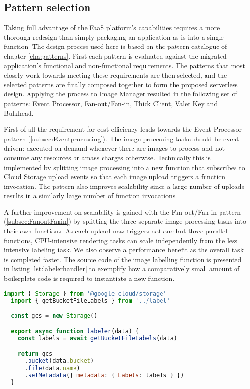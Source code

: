 \subsection{Pattern selection}

Taking full advantage of the FaaS platform's capabilities requires a more thorough redesign than simply packaging an application as-is into a single function. The design process used here is based on the pattern catalogue of chapter \ref{cha:patterns}. First each pattern is evaluated against the migrated application's functional and non-functional requirements. The patterns that most closely work towards meeting these requirements are then selected, and the selected patterns are finally composed together to form the proposed serverless design. Applying the process to Image Manager resulted in the following set of patterns: Event Processor, Fan-out/Fan-in, Thick Client, Valet Key and Bulkhead.

First of all the requirement for cost-efficiency leads towards the Event Processor pattern (\ref{subsec:Eventprocessing}). The image processing tasks should be event-driven: executed on-demand whenever there are images to process and not consume any resources or amass charges otherwise. Technically this is implemented by splitting image processing into a new function that subscribes to Cloud Storage upload events so that each image upload triggers a function invocation. The pattern also improves scalability since a large number of uploads results in a similarly large number of function invocations.

A further improvement on scalability is gained with the Fan-out/Fan-in pattern (\ref{subsec:FanoutFanin}) by splitting the three separate image processing tasks into their own functions. As each upload now triggers not one but three parallel functions, CPU-intensive rendering tasks can scale independently from the less intensive labeling task. We also observe a performance benefit as the overall task is completed faster. The source code of the image labelling function is presented in listing \ref{lst:labelerhandler} to exemplify how a comparatively small amount of boilerplate code is required to instantiate a new function.

\begin{lstlisting}[language=JavaScript,caption=Image labeler function handler,captionpos=b,label=lst:labelerhandler,showstringspaces=false,belowskip=2em,frame=tb,aboveskip=2em]
  import { Storage } from '@google-cloud/storage'
  import { getBucketFileLabels } from '../label'

  const gcs = new Storage()

  export async function labeler(data) {
    const labels = await getBucketFileLabels(data)

    return gcs
      .bucket(data.bucket)
      .file(data.name)
      .setMetadata({ metadata: { Labels: labels } })
  }
\end{lstlisting}

